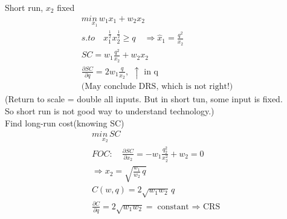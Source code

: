 \documentclass[letterpaper,13pt,single,pdftex]{scrartcl}
\begin{document}
Short run, $x_2$ fixed
\begin{gather*}
    min\limits_{x_1} \, w_1x_1 +w_2x_2\\
    s.to \quad x_1^{\frac{1}{2}}x_2^{\frac{1}{2}} \ge q \quad \Rightarrow \hat{x}_1 = \frac{q^2}{x_2}\\
    SC = w_1 \frac{q^2}{x_2} + w_2x_2\\
    \frac{\partial SC}{\partial q} = 2w_1 \frac{q}{x_2}, \,\, \uparrow \text{ in q}\\
    \text{(May conclude DRS, which is not right!)}
\end{gather*}
  (Return to scale = double all inputs. But in short tun, some input is fixed.\\So short run is not good way to understand technology.)\\
Find long-run cost(knowing SC)
\begin{gather*}
    min \limits_{x_2}\, SC\\
    FOC:\quad \frac{\partial SC}{\partial x_2} = -w_1 \frac{q_2^2}{x_2^2} + w_2 = 0\\
    \Rightarrow x_2 = \sqrt{\frac{w_1}{w_2}\,q}\\
    C(w,q) = 2\sqrt{w_1 w_2}\,q\\
    \frac{\partial C}{\partial q} = 2\sqrt{w_1 w_2} = \text{constant $\Rightarrow$ CRS}
\end{gather*}
\end{document}
